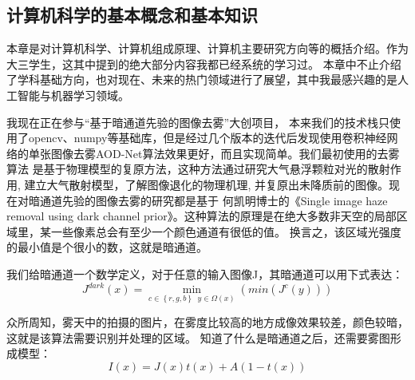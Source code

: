 \documentclass{article}
\begin{document}
\subsection{计算机科学的基本概念和基本知识}
本章是对计算机科学、计算机组成原理、计算机主要研究方向等的概括介绍。作为大三学生，这其中提到的绝大部分内容我都已经系统的学习过。
本章中不止介绍了学科基础方向，也对现在、未来的热门领域进行了展望，其中我最感兴趣的是人工智能与机器学习领域。\par
我现在正在参与“基于暗通道先验的图像去雾”大创项目，
本来我们的技术栈只使用了opencv、numpy等基础库，但是经过几个版本的迭代后发现使用卷积神经网络的单张图像去雾AOD-Net\citep{aod}算法效果更好，而且实现简单。我们最初使用的去雾算法
是基于物理模型的复原方法，这种方法通过研究大气悬浮颗粒对光的散射作用, 建立大气散射模型，了解图像退化的物理机理, 并复原出未降质前的图像。现在对暗通道先验的图像去雾的研究都是基于
何凯明博士的《Single image haze removal using dark channel prior》\citep{dehaze}。这种算法的原理是在绝大多数非天空的局部区域里，某一些像素总会有至少一个颜色通道有很低的值。
换言之，该区域光强度的最小值是个很小的数，这就是暗通道。\par
我们给暗通道一个数学定义，对于任意的输入图像J，其暗通道可以用下式表达：
\begin{equation}
J^{dark}\left ( x \right )=\min_{c\in\left \{ r,g,b \right \}\;\;y\in\Omega \left ( x \right )}\left ( min(J^{c}(y)) \right )
\end{equation}\par
众所周知，雾天中的拍摄的图片，在雾度比较高的地方成像效果较差，颜色较暗，这就是该算法需要识别并处理的区域。
知道了什么是暗通道之后，还需要雾图形成模型：
\begin{equation}
    I\left ( x \right )=J\left ( x \right )t\left ( x \right )+A\left ( 1-t\left ( x \right ) \right )    
\end{equation}\par
\end{document}

